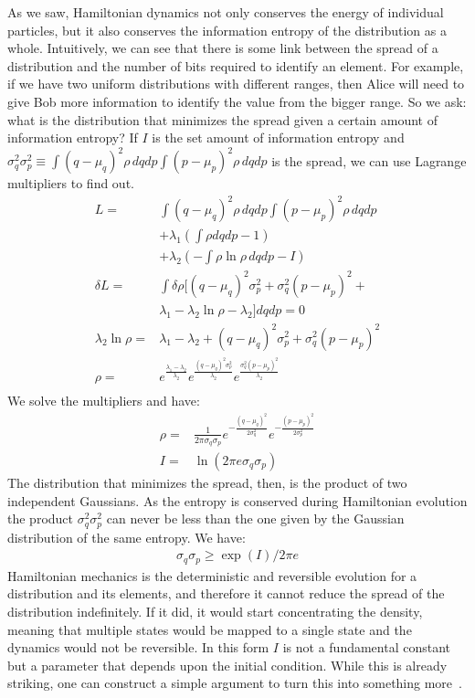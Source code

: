 \documentclass[11pt]{elsarticle}
\begin{document}
As we saw, Hamiltonian dynamics not only conserves the energy of individual particles, but it also conserves the information entropy of the distribution as a whole. Intuitively, we can see that there is some link between the spread of a distribution and the number of bits required to identify an element. For example, if we have two uniform distributions with different ranges, then Alice will need to give Bob more information to identify the value from the bigger range. So we ask: what is the distribution that minimizes the spread given a certain amount of information entropy? If $I$ is the set amount of information entropy and $\sigma_q^2 \sigma_p^2 \equiv \int (q-\mu_q)^2 \rho \, dqdp \int (p-\mu_p)^2 \rho \, dqdp$ is the spread, we can use Lagrange multipliers to find out.
\begin{align*}
L = &\int (q-\mu_q)^2 \rho \, dqdp \int (p-\mu_p)^2 \rho \, dqdp \\
&+ \lambda_1(\int \rho dqdp - 1) \\ &+ \lambda_2(- \int \rho \ln \rho \, dqdp - I)\\ 
\delta L = &\int \delta \rho [(q-\mu_q)^2 \sigma_p^2 + \sigma_q^2 (p-\mu_p)^2 + \\ &\lambda_1 - \lambda_2 \ln \rho - \lambda_2 ] dqdp = 0 \\
\lambda_2 \ln \rho = &\lambda_1 - \lambda_2 + (q-\mu_q)^2 \sigma_p^2 + \sigma_q^2 (p-\mu_p)^2 \\
\rho = &e^{\frac{\lambda_1 - \lambda_2}{\lambda_2}}e^{\frac{(q-\mu_q)^2 \sigma_p^2}{\lambda_2}}e^{\frac{\sigma_q^2 (p-\mu_p)^2}{\lambda_2}}\\
\end{align*}
We solve the multipliers and have:
\begin{align*}
\rho = &\frac{1}{ 2 \pi \sigma_q \sigma_p} e^{-\frac{(q-\mu_q)^2}{2\sigma_q^2}} e^{-\frac{(p-\mu_p)^2}{2\sigma_p^2}} \\
I = &\ln (2\pi e\sigma_q\sigma_p)
\end{align*}
The distribution that minimizes the spread, then, is the product of two independent Gaussians. As the entropy is conserved during Hamiltonian evolution the product $\sigma_q^2 \sigma_p^2$ can never be less than the one given by the Gaussian distribution of the same entropy. We have:
\begin{align*}
\sigma_q\sigma_p \geq \exp (I) / 2 \pi e 
\end{align*}
Hamiltonian mechanics is the deterministic and reversible evolution for a distribution and its elements, and therefore it cannot reduce the spread of the distribution indefinitely. If it did, it would start concentrating the density, meaning that multiple states would be mapped to a single state and the dynamics would not be reversible. In this form $I$ is not a fundamental constant but a parameter that depends upon the initial condition. While this is already striking, one can construct a simple argument to turn this into something more~\cite{AoPPhy1}.
\end{document}
